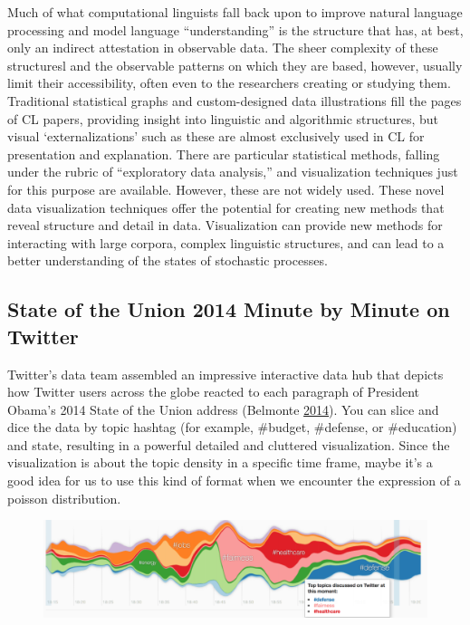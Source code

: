 \documentclass[]{book}
\theoremstyle{definition}
\theoremstyle{definition}
\theoremstyle{definition}
\theoremstyle{remark}
\begin{document}
Much of what computational linguists fall back upon to improve natural
language processing and model language ``understanding'' is the
structure that has, at best, only an indirect attestation in observable
data. The sheer complexity of these structuresl and the observable
patterns on which they are based, however, usually limit their
accessibility, often even to the researchers creating or studying them.
Traditional statistical graphs and custom-designed data illustrations
fill the pages of CL papers, providing insight into linguistic and
algorithmic structures, but visual `externalizations' such as these are
almost exclusively used in CL for presentation and explanation. There
are particular statistical methods, falling under the rubric of
``exploratory data analysis,'' and visualization techniques just for
this purpose are available. However, these are not widely used. These
novel data visualization techniques offer the potential for creating new
methods that reveal structure and detail in data. Visualization can
provide new methods for interacting with large corpora, complex
linguistic structures, and can lead to a better understanding of the
states of stochastic processes.

\subsection{State of the Union 2014 Minute by Minute on
Twitter}\label{state-of-the-union-2014-minute-by-minute-on-twitter}

Twitter's data team assembled an impressive interactive data hub that
depicts how Twitter users across the globe reacted to each paragraph of
President Obama's 2014 State of the Union address (Belmonte
\protect\hyperlink{ref-SotU2014}{2014}). You can slice and dice the data
by topic hashtag (for example, \#budget, \#defense, or \#education) and
state, resulting in a powerful detailed and cluttered visualization.
Since the visualization is about the topic density in a specific time
frame, maybe it's a good idea for us to use this kind of format when we
encounter the expression of a poisson distribution.

\begin{figure}
\centering
\includegraphics{images/SotU2014.png}
\caption{}
\end{figure}
\end{document}
